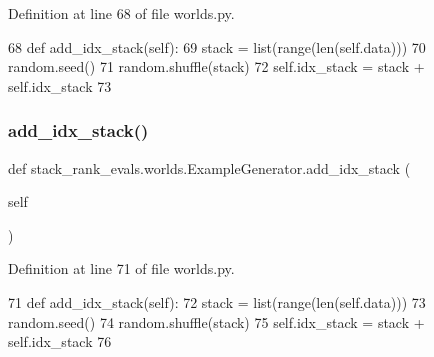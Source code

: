 Definition at line 68 of file worlds.\+py.


\begin{DoxyCode}
68     \textcolor{keyword}{def }add\_idx\_stack(self):
69         stack = list(range(len(self.data)))
70         random.seed()
71         random.shuffle(stack)
72         self.idx\_stack = stack + self.idx\_stack
73 
\end{DoxyCode}
\mbox{\label{classstack__rank__evals_1_1worlds_1_1ExampleGenerator_a9bc7f39d14003d695ad66b624607dc05}} 
\subsubsection{\texorpdfstring{add\+\_\+idx\+\_\+stack()}{add\_idx\_stack()}\hspace{0.1cm}{\footnotesize\ttfamily [2/2]}}
{\footnotesize\ttfamily def stack\+\_\+rank\+\_\+evals.\+worlds.\+Example\+Generator.\+add\+\_\+idx\+\_\+stack (\begin{DoxyParamCaption}\item[{}]{self }\end{DoxyParamCaption})}



Definition at line 71 of file worlds.\+py.


\begin{DoxyCode}
71     \textcolor{keyword}{def }add\_idx\_stack(self):
72         stack = list(range(len(self.data)))
73         random.seed()
74         random.shuffle(stack)
75         self.idx\_stack = stack + self.idx\_stack
76 
\end{DoxyCode}
\mbox{\label{classstack__rank__evals_1_1worlds_1_1ExampleGenerator_ae50d35087dd679c73aa8f5354845199f}} 
